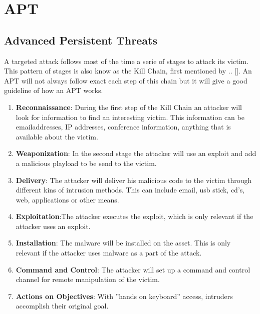 \chapter{APT}
\label{cha:7}



\section{Advanced Persistent Threats}

A targeted attack follows most of the time a serie of stages to attack its victim. This pattern of stages is also know as the Kill Chain, first mentioned by .. []. An APT will not always follow exact each step of this chain but it will give a good guideline of how an APT works. 
\begin{enumerate}
\item \textbf{Reconnaissance}: During the first step of the Kill Chain an attacker will look for information to find an interesting victim. This information can be emailaddresses, IP addresses, conference information, anything that is available about the victim.
\item \textbf{Weaponization}: In the second stage the attacker will use an exploit and add a malicious playload to be send to the victim. 
\item \textbf{Delivery}: The attacker will deliver his malicious code to the victim through different kins of intrusion methods. This can include email, usb stick, cd's, web, applications or other means.
\item \textbf{Exploitation}:The attacker executes the exploit, which is only relevant if the attacker uses an exploit.
\item \textbf{Installation}: The malware will be installed on the asset. This is only relevant if the attacker uses malware as a part of the attack.
\item \textbf{Command and Control}: The attacker will set up a command and control channel for remote manipulation of the victim.
\item \textbf{Actions on Objectives}: With ''hands on keyboard'' access, intruders accomplish their original goal. 
\end{enumerate}

